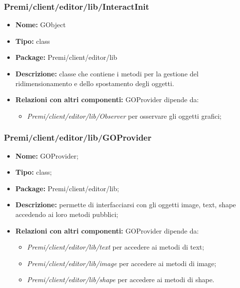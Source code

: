 \subsubsection{Premi/client/editor/lib/InteractInit}
\begin{itemize}
  \item[] \textbf{Nome:} GObject
  \item[] \textbf{Tipo:} class
  \item[] \textbf{Package:} Premi/client/editor/lib
  \item[] \textbf{Descrizione:} classe che contiene i metodi per la gestione del ridimensionamento e dello spostamento degli oggetti.
  \item[] \textbf{Relazioni con altri componenti:} GOProvider dipende da:
  \begin{itemize}
  	\item \textit{Premi/client/editor/lib/Observer} per osservare gli oggetti grafici;
  \end{itemize}
\end{itemize}
\subsubsection{Premi/client/editor/lib/GOProvider}
\begin{itemize}
  \item[] \textbf{Nome:} GOProvider;
  \item[] \textbf{Tipo:} class;
  \item[] \textbf{Package:} Premi/client/editor/lib;
  \item[] \textbf{Descrizione:} permette di interfacciarsi con gli oggetti image, text, shape accedendo ai loro metodi pubblici;
  \item[] \textbf{Relazioni con altri componenti:} GOProvider dipende da:
  \begin{itemize}
  	\item \textit{Premi/client/editor/lib/text} per accedere ai metodi di text;
  	\item \textit{Premi/client/editor/lib/image} per accedere ai metodi di image;
  	\item \textit{Premi/client/editor/lib/shape} per accedere ai metodi di shape.
  \end{itemize}
\end{itemize}
